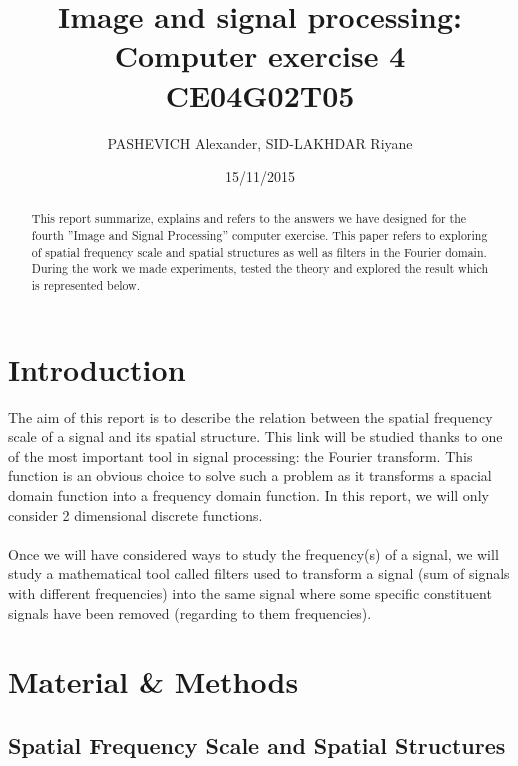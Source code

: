 \documentclass[a4paper]{article}
\title{Image and signal processing: Computer exercise 4\\CE04G02T05}
\author{PASHEVICH Alexander, SID-LAKHDAR Riyane}
\date{15/11/2015}
\begin{document}


\maketitle


\begin{abstract}
This report summarize, explains and refers to the answers we have designed for the fourth ''Image and Signal Processing'' computer exercise. This paper refers to exploring of spatial frequency scale and spatial structures as well as filters in the Fourier domain. During the work we made experiments, tested the theory and explored the result which is represented below.
\end{abstract}

\section{Introduction}
The aim of this report is to describe the relation between the spatial frequency scale of a signal and its spatial structure. This link will be studied thanks to one of the most important tool in signal processing: the Fourier transform. This function is an obvious choice to solve such a problem as it transforms a spacial domain function into a frequency domain function.   In this report, we will only consider 2 dimensional discrete functions.\\\\
Once we will have considered ways to study the frequency(s) of a signal, we will study a mathematical tool called filters used to transform a signal (sum of signals with different frequencies) into the same signal where some specific constituent signals have been removed (regarding to them frequencies).



\section{Material \& Methods}
    \subsection{Spatial Frequency Scale and Spatial Structures}
\end{document}
